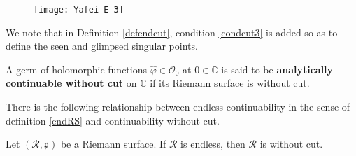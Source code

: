 \documentclass[11pt, english]{smfart}
\theoremstyle{definition}
\begin{document}
\begin{figure}[thp]
\centering\texttt{[image: Yafei-E-3]}\\
  \centering\caption{}\label{Yafei-E-3}
\end{figure}

We note that in Definition \ref{defendcut}, condition \ref{condcut3}
is added so as to define the seen and glimpsed singular points.

\begin{defi}
A germ of holomorphic functions $\widehat{\varphi} \in \mathcal{O}_0$ at $0
\in \mathbb{C}$ is said to be
\textbf{analytically continuable without cut} on $\mathbb{C}$ if its Riemann surface is
without cut.
\end{defi}

There is the following relationship between endless continuability in
the sense of definition \ref{endRS} and continuability without cut.

\begin{prop}
Let $(\mathscr{R}, \mathfrak{p})$ be a  Riemann surface. If $\mathscr{R}$
is endless, then $\mathscr{R}$ is without cut.
\end{prop}
\end{document}
